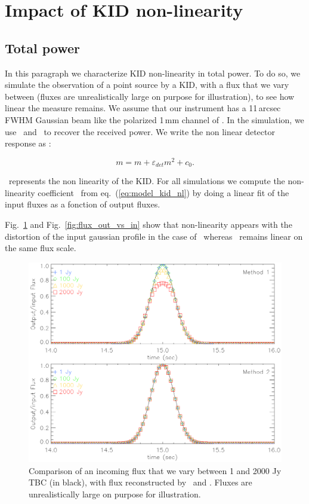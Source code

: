 \section{Impact of KID non-linearity}
\label{se:KID_NL}

\subsection{Total power}

In this paragraph we characterize KID non-linearity in total power. To do so, we simulate the observation of a point source by a KID, with a flux that we vary between  (fluxes are unrealistically large on purpose for illustration), to see how linear the measure remains. We assume that our instrument has a 11\,arcsec FWHM Gaussian beam like the polarized 1\,mm channel of \nikad. In the simulation, we use \methodu\ and  \methodd\ to recover the received power. We write the non linear detector response as :

\begin{equation}
m = m + \varepsilon_{det} m^2 +c_{0}.
\label{eq:model_kid_nl}
\end{equation}

\epsDET\ represents the non linearity of the KID. 
For all simulations we compute the non-linearity coefficient \epsDET\ from eq.~(\ref{eq:model_kid_nl}) by doing a linear fit of the input fluxes as a fonction of output fluxes.

Fig.~\ref{fig:planet_profiles} and Fig.~\ref{fig:flux_out_vs_in} show that non-linearity appears with the distortion of the input gaussian profile in the case of \methodu\ whereas \methodd\ remains linear on the same flux scale. 

\begin{figure}
  \includegraphics[clip, angle=0, width=\columnwidth]{Figures/planet_profiles_2.eps}
  \caption{Comparison of an incoming flux that we vary between 1 and 2000 Jy TBC (in black), with flux reconstructed by \methodu\ and \methodd. Fluxes are unrealistically large on purpose for illustration. }
  \label{fig:planet_profiles}
\end{figure}


